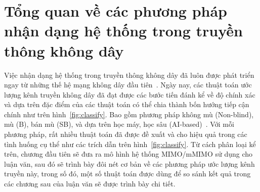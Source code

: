 \clearpage
{}

\setcounter{chapter}{0}
\chapter[TỔNG QUAN VỀ CÁC PHƯƠNG PHÁP NHẬN DẠNG HỆ THỐNG TRONG TRUYỀN THÔNG KHÔNG DÂY]{Tổng quan về các phương pháp nhận dạng hệ thống trong truyền thông không dây}
\label{sec:back}

Việc nhận dạng hệ thống trong truyền thông không dây đã luôn được phát triển ngay từ những thế hệ mạng không dây đầu tiên~\cite{Tse2005}. Ngày nay, các thuật toán ước lượng kênh truyền không dây đã đạt được các bước tiến đánh kể về độ chính xác và dựa trên đặc điểm của các thuật toán có thể chia thành bốn hướng tiếp cận chính như trên hình~\ref{fig:classify}. Bao gồm phương pháp không mù (Non-blind), mù (B), bán mù (SB), và dựa trên học máy, học sâu (AI-based)~\cite{vilas2022}. 
Với mỗi phương pháp, rất nhiều thuật toán đã được đề xuất và cho hiệu quả trong các tình huống cụ thể như các trích dẫn trên hình~\ref{fig:classify}.
Từ cách phân loại kể trên, chương đầu tiên sẽ đưa ra mô hình hệ thống MIMO/mMIMO sử dụng cho luận văn, sau đó sẽ trình bày đôi nét cơ bản về các phương pháp ước lượng kênh truyền này, trong số đó, một số thuật toán được dùng để so sánh kết quả trong các chương sau của luận văn sẽ được trình bày chi tiết.

